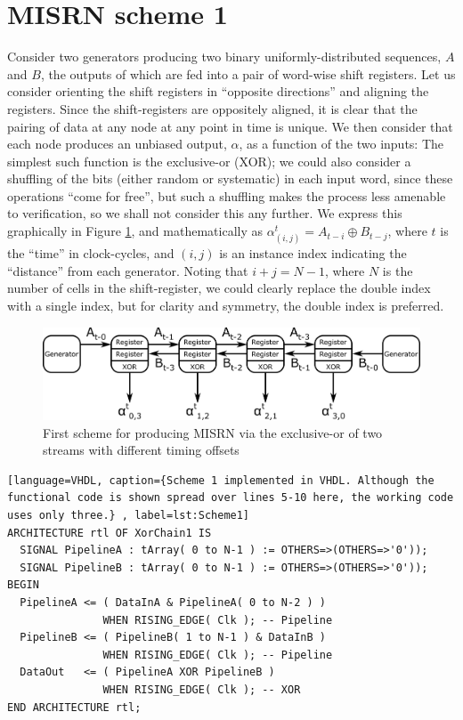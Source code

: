 \documentclass{article}
\newcommand{\xor}{\oplus}
\newcommand{\A}[1]{A_{t-#1}}
\newcommand{\B}[1]{B_{t-#1}}
\begin{document}
\section{MISRN scheme 1}

Consider two generators producing two binary uniformly-distributed sequences, $A$ and $B$, the outputs of which are fed into a pair of word-wise shift registers. Let us consider orienting the shift registers in ``opposite directions'' and aligning the registers. Since the shift-registers are oppositely aligned, it is clear that the pairing of data at any node at any point in time is unique. We then consider that each node produces an unbiased output, $\alpha$, as a function of the two inputs: The simplest such function is the exclusive-or (XOR); we could also consider a shuffling of the bits (either random or systematic) in each input word, since these operations ``come for free'', but such a shuffling makes the process less amenable to verification, so we shall not consider this any further. We express this graphically in Figure \ref{fig:scheme1}, and mathematically as $\alpha^t_{(i,j)} = \A{i} \xor \B{j}$, where $t$ is the ``time'' in clock-cycles, and $(i,j)$ is an instance index indicating the ``distance'' from each generator. Noting that $i+j = N-1$, where $N$ is the number of cells in the shift-register, we could clearly replace the double index with a single index, but for clarity and symmetry, the double index is preferred.

\begin{figure}[ht]
\centering
\includegraphics[width=\textwidth]{MISRN.png}
\caption{First scheme for producing MISRN via the exclusive-or of two streams with different timing offsets}
\label{fig:scheme1}
\end{figure}

\begin{minipage}{1.0\textwidth}
\centering
\begin{lstlisting}[language=VHDL, caption={Scheme 1 implemented in VHDL. Although the functional code is shown spread over lines 5-10 here, the working code uses only three.} , label=lst:Scheme1]
ARCHITECTURE rtl OF XorChain1 IS
  SIGNAL PipelineA : tArray( 0 to N-1 ) := OTHERS=>(OTHERS=>'0'));
  SIGNAL PipelineB : tArray( 0 to N-1 ) := OTHERS=>(OTHERS=>'0'));
BEGIN
  PipelineA <= ( DataInA & PipelineA( 0 to N-2 ) )
               WHEN RISING_EDGE( Clk ); -- Pipeline
  PipelineB <= ( PipelineB( 1 to N-1 ) & DataInB )
               WHEN RISING_EDGE( Clk ); -- Pipeline
  DataOut   <= ( PipelineA XOR PipelineB )
               WHEN RISING_EDGE( Clk ); -- XOR
END ARCHITECTURE rtl;
\end{lstlisting}
\end{minipage}
\end{document}
